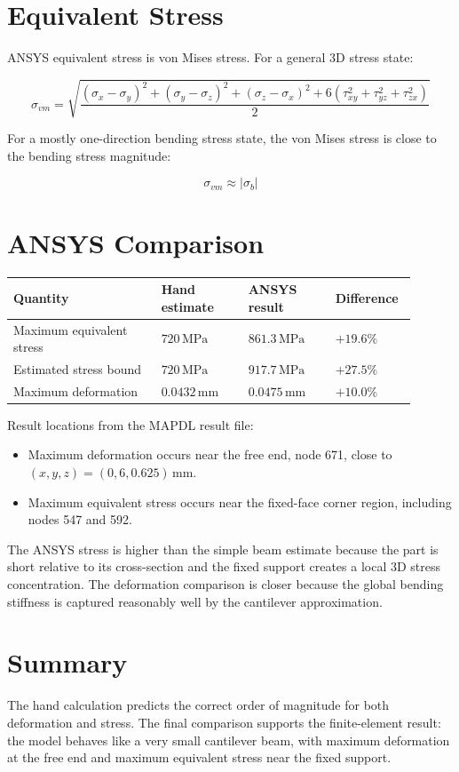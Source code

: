 \documentclass[11pt]{article}
\newcommand{\unit}[1]{\,\mathrm{#1}}
\newcommand{\MPa}{\unit{MPa}}
\begin{document}
\section{Equivalent Stress}

ANSYS equivalent stress is von Mises stress. For a general 3D stress state:

\begin{equation}
\sigma_{vm}=
\sqrt{\frac{(\sigma_x-\sigma_y)^2+(\sigma_y-\sigma_z)^2+(\sigma_z-\sigma_x)^2+6(\tau_{xy}^2+\tau_{yz}^2+\tau_{zx}^2)}{2}}
\end{equation}

For a mostly one-direction bending stress state, the von Mises stress is close to the bending stress magnitude:

\begin{equation}
\sigma_{vm}\approx |\sigma_b|
\end{equation}

\section{ANSYS Comparison}

\begin{center}
\begin{tabular}{p{0.34\linewidth} p{0.20\linewidth} p{0.20\linewidth} p{0.16\linewidth}}
\toprule
Quantity & Hand estimate & ANSYS result & Difference \\
\midrule
Maximum equivalent stress & $720\MPa$ & $861.3\MPa$ & $+19.6\%$ \\
Estimated stress bound & $720\MPa$ & $917.7\MPa$ & $+27.5\%$ \\
Maximum deformation & $0.0432\unit{mm}$ & $0.0475\unit{mm}$ & $+10.0\%$ \\
\bottomrule
\end{tabular}
\end{center}

Result locations from the MAPDL result file:

\begin{itemize}
  \item Maximum deformation occurs near the free end, node 671, close to $(x,y,z)=(0,6,0.625)\unit{mm}$.
  \item Maximum equivalent stress occurs near the fixed-face corner region, including nodes 547 and 592.
\end{itemize}

The ANSYS stress is higher than the simple beam estimate because the part is short relative to its cross-section and the fixed support creates a local 3D stress concentration. The deformation comparison is closer because the global bending stiffness is captured reasonably well by the cantilever approximation.

\section{Summary}

The hand calculation predicts the correct order of magnitude for both deformation and stress. The final comparison supports the finite-element result: the model behaves like a very small cantilever beam, with maximum deformation at the free end and maximum equivalent stress near the fixed support.
\end{document}
